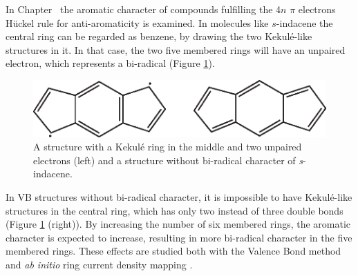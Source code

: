 In Chapter \chindacene\ the aromatic character of compounds fulfilling the 4$n$ $\pi$ electrons H\"{u}ckel rule for anti-aromaticity is examined. In molecules like $s$-indacene the central ring can be regarded as benzene, by drawing the two Kekul\'e-like structures in it. In that case, the two five membered rings will have an unpaired electron, which represents a bi-radical (Figure \ref{ch1.fig.indacene}). 
\begin{figure}[htp]
\center
\includegraphics{introduction/figures/indacene.eps}
\caption{A structure with a Kekul\'e ring in the middle and two unpaired electrons (left) and a structure without bi-radical character of \textit{s}-indacene.}
\label{ch1.fig.indacene}
\end{figure}
In VB structures without bi-radical character, it is impossible to have Kekul\'e-like structures in the central ring, which has only two instead of three double bonds (Figure \ref{ch1.fig.indacene} (right)). By increasing the number of six membered rings, the aromatic character is expected to increase, resulting in more bi-radical character in the five membered rings. These effects are studied both with the Valence Bond method and \textit{ab initio} ring current density mapping \cite{indacene}.  


 
